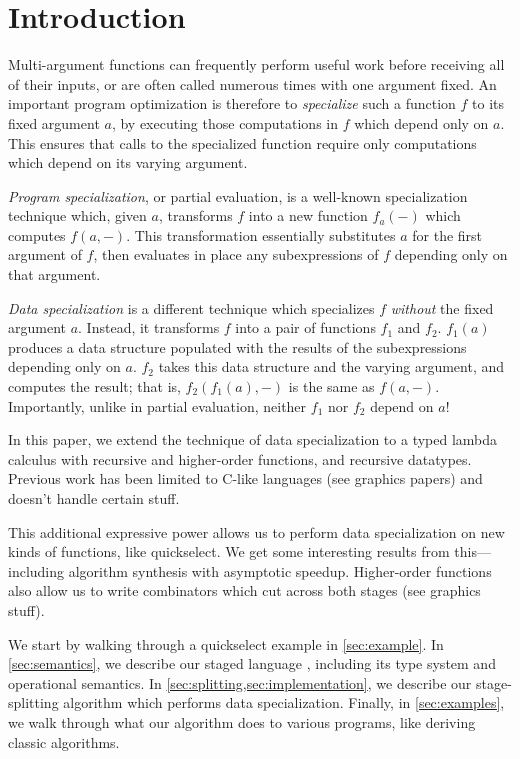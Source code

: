 \section{Introduction}

Multi-argument functions can frequently perform useful work before receiving all
of their inputs, or are often called numerous times with one argument fixed. An
important program optimization is therefore to \emph{specialize} such a function
$f$ to its fixed argument $a$, by executing those computations in $f$ which
depend only on $a$. This ensures that calls to the specialized function require
only computations which depend on its varying argument.

\emph{Program specialization}, or partial evaluation, is a well-known
specialization technique which, given $a$, transforms $f$ into a new function
$f_a(-)$ which computes $f(a,-)$. This transformation essentially substitutes
$a$ for the first argument of $f$, then evaluates in place any subexpressions of
$f$ depending only on that argument.

\emph{Data specialization} \cite{knoblock96} is a different technique which
specializes $f$ \emph{without} the fixed argument $a$. Instead, it transforms
$f$ into a pair of functions $f_1$ and $f_2$. $f_1(a)$ produces a data structure
populated with the results of the subexpressions depending only on $a$. $f_2$
takes this data structure and the varying argument, and computes the result;
that is, $f_2(f_1(a),-)$ is the same as $f(a,-)$. Importantly, unlike in partial
evaluation, neither $f_1$ nor $f_2$ depend on $a$!

In this paper, we extend the technique of data specialization to a typed lambda
calculus with recursive and higher-order functions, and recursive datatypes.
Previous work has been limited to C-like languages (see graphics papers) and
doesn't handle certain stuff.

This additional expressive power allows us to perform data specialization on new
kinds of functions, like quickselect. We get some interesting results from
this---including algorithm synthesis with asymptotic speedup. Higher-order
functions also allow us to write combinators which cut across both stages (see
graphics stuff).

We start by walking through a quickselect example in \ref{sec:example}.
In \ref{sec:semantics}, we describe our staged language \lang, including its
type system and operational semantics.
In \ref{sec:splitting,sec:implementation}, we describe our stage-splitting
algorithm which performs data specialization.
Finally, in \ref{sec:examples}, we walk through what our algorithm does to
various programs, like deriving classic algorithms.

